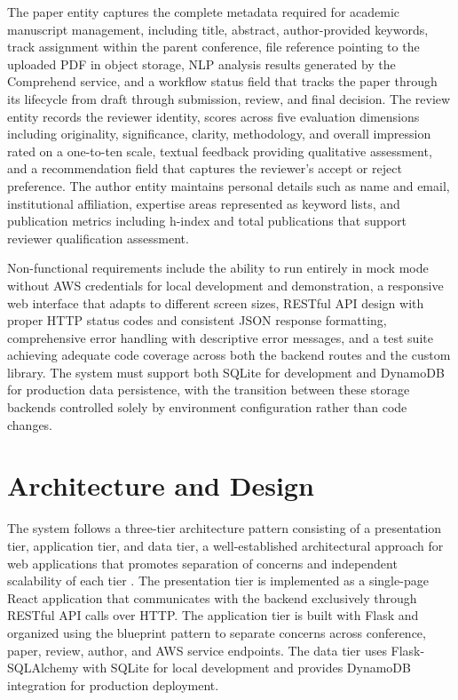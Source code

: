 \documentclass[conference]{IEEEtran}
\begin{document}
The paper entity captures the complete metadata required for academic manuscript management, including title, abstract, author-provided keywords, track assignment within the parent conference, file reference pointing to the uploaded PDF in object storage, NLP analysis results generated by the Comprehend service, and a workflow status field that tracks the paper through its lifecycle from draft through submission, review, and final decision. The review entity records the reviewer identity, scores across five evaluation dimensions including originality, significance, clarity, methodology, and overall impression rated on a one-to-ten scale, textual feedback providing qualitative assessment, and a recommendation field that captures the reviewer's accept or reject preference. The author entity maintains personal details such as name and email, institutional affiliation, expertise areas represented as keyword lists, and publication metrics including h-index and total publications that support reviewer qualification assessment.

Non-functional requirements include the ability to run entirely in mock mode without AWS credentials for local development and demonstration, a responsive web interface that adapts to different screen sizes, RESTful API design with proper HTTP status codes and consistent JSON response formatting, comprehensive error handling with descriptive error messages, and a test suite achieving adequate code coverage across both the backend routes and the custom library. The system must support both SQLite for development and DynamoDB for production data persistence, with the transition between these storage backends controlled solely by environment configuration rather than code changes.

\section{Architecture and Design}

The system follows a three-tier architecture pattern consisting of a presentation tier, application tier, and data tier, a well-established architectural approach for web applications that promotes separation of concerns and independent scalability of each tier \cite{newman2021}. The presentation tier is implemented as a single-page React application that communicates with the backend exclusively through RESTful API calls over HTTP. The application tier is built with Flask and organized using the blueprint pattern to separate concerns across conference, paper, review, author, and AWS service endpoints. The data tier uses Flask-SQLAlchemy with SQLite for local development and provides DynamoDB integration for production deployment.
\end{document}
